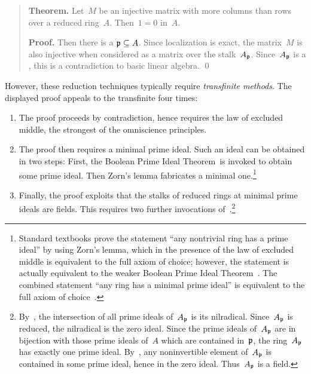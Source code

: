 \documentclass{ws-rv9x6}
\begin{document}
{\begin{quote}
\textbf{Theorem.} Let~$M$ be an injective matrix with more columns than rows
over a reduced ring~$A$. Then~$1 = 0$ in~$A$.

\textbf{Proof.}  Then there is a  $\mathfrak{p} \subseteq A$. Since localization is exact, the matrix~$M$ is also injective when
considered as a matrix over the stalk~$A_{\mathfrak{p}}$. Since~$A_{\mathfrak{p}}$ is a
, this is a contradiction to basic linear algebra. \qed
\end{quote}

However, these reduction techniques typically require \emph{transfinite
methods}. The displayed proof appeals to the transfinite four times:
\begin{enumerate}
\item The proof proceeds by contradiction, hence requires the law of excluded
middle, the strongest of the omniscience principles.
\item The proof then requires a minimal prime ideal. Such an ideal can be
obtained in two steps: First, the Boolean Prime Ideal
Theorem~\BPIT is invoked to obtain some prime ideal. Then
Zorn's lemma fabricates a minimal one.\footnote{Standard textbooks prove the statement ``any nontrivial
ring has a prime ideal'' by using Zorn's lemma, which
in the presence of the law of excluded middle is equivalent to the full axiom
of choice; however, the statement is actually equivalent to the weaker Boolean
Prime Ideal Theorem~\cite{scott:bpit,banaschewski-harting:lattice-aspects}.
The combined statement ``any ring has a minimal prime ideal'' is equivalent to
the full axiom of choice~\cite{savin:minimal-prime-ideals}.}
\item Finally, the proof exploits that the stalks of reduced rings at minimal
prime ideals are fields. This requires two further invocations
of~\BPIT.\footnote{By~\BPIT, the intersection of all prime ideals of~$A_{\mathfrak{p}}$
is its nilradical. Since~$A_{\mathfrak{p}}$ is reduced, the nilradical is the zero ideal.
Since the prime ideals of~$A_{\mathfrak{p}}$ are in bijection with those prime ideals
of~$A$ which are contained in~$\mathfrak{p}$, the ring~$A_{\mathfrak{p}}$ has exactly one prime
ideal. By~\BPIT, any noninvertible element of~$A_{\mathfrak{p}}$ is contained in some
prime ideal, hence in the zero ideal. Thus~$A_{\mathfrak{p}}$ is a field.}
\end{enumerate}

}
\end{document}
